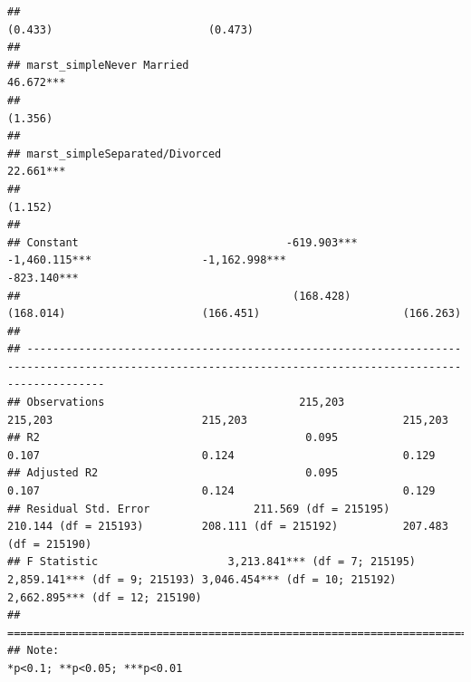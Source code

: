 \documentclass[
]{article}
\begin{document}
\begin{verbatim}
##                                                                                                       (0.433)                        (0.473)            
##                                                                                                                                                         
## marst_simpleNever Married                                                                                                           46.672***           
##                                                                                                                                      (1.356)            
##                                                                                                                                                         
## marst_simpleSeparated/Divorced                                                                                                      22.661***           
##                                                                                                                                      (1.152)            
##                                                                                                                                                         
## Constant                                -619.903***                  -1,460.115***                 -1,162.998***                   -823.140***          
##                                          (168.428)                     (168.014)                     (166.451)                      (166.263)           
##                                                                                                                                                         
## --------------------------------------------------------------------------------------------------------------------------------------------------------
## Observations                              215,203                       215,203                       215,203                        215,203            
## R2                                         0.095                         0.107                         0.124                          0.129             
## Adjusted R2                                0.095                         0.107                         0.124                          0.129             
## Residual Std. Error                211.569 (df = 215195)         210.144 (df = 215193)         208.111 (df = 215192)          207.483 (df = 215190)     
## F Statistic                    3,213.841*** (df = 7; 215195) 2,859.141*** (df = 9; 215193) 3,046.454*** (df = 10; 215192) 2,662.895*** (df = 12; 215190)
## ========================================================================================================================================================
## Note:                                                                                                                        *p<0.1; **p<0.05; ***p<0.01
\end{verbatim}
\end{document}
